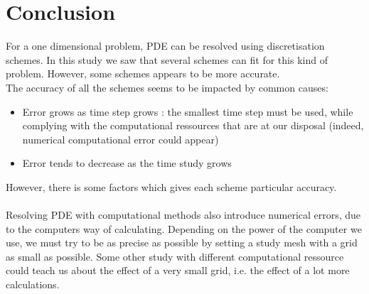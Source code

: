 \documentclass{article}
\begin{document}
        \newpage
        \section{Conclusion}
            For a one dimensional problem, PDE can be resolved using discretisation schemes. In this study
            we saw that several schemes can fit for this kind of problem. However, some schemes appears to
            be more accurate.\\
            The accuracy of all the schemes seems to be impacted by common causes:
            \begin{itemize}
                \item{Error grows as time step grows : the smallest time step must be used, while complying with
                the computational ressources that are at our disposal (indeed, numerical computational error could appear)}
                \item{Error tends to decrease as the time study grows}
            \end{itemize}
            
            However, there is some factors which gives each scheme particular accuracy.\\
            \\
            Resolving PDE with computational methods also introduce numerical errors, due to the computers way
            of calculating. Depending on the power of the computer we use, we must try to be as precise as possible
            by setting a study mesh with a grid as small as possible. Some other study with different computational ressource
            could teach us about the effect of a very small grid, i.e. the effect of a lot more calculations.
            
    
        \newpage
\end{document}
